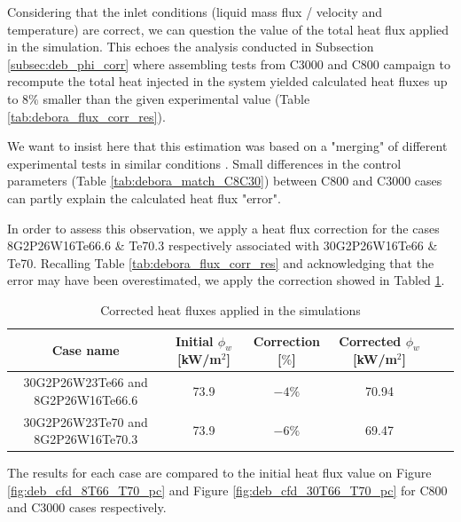\npar

Considering that the inlet conditions (liquid mass flux / velocity and temperature) are correct, we can question the value of the total heat flux applied in the simulation. This echoes the analysis conducted in Subsection \ref{subsec:deb_phi_corr} where assembling tests from C3000 and C800 campaign to recompute the total heat injected in the system yielded calculated heat fluxes up to $8\%$ smaller than the given experimental value (Table \ref{tab:debora_flux_corr_res}).

\begin{note*}{}
We want to insist here that this estimation was based on a "merging" of different experimental tests in similar conditions . Small differences in the control parameters (Table \ref{tab:debora_match_C8C30}) between C800 and C3000 cases can partly explain the calculated heat flux "error".
\end{note*}

\npar

In order to assess this observation, we apply a heat flux correction for the cases 8G2P26W16Te66.6 \& Te70.3 respectively associated with 30G2P26W16Te66 \& Te70. Recalling  Table \ref{tab:debora_flux_corr_res} and acknowledging that the error may have been overestimated, we apply the correction showed in Tabled \ref{tab:debora_cfd_phicorr}.
 





\begin{table}[!h]
\centering

\begin{tabular}{c||c|c|c|c|c}
Case name & Initial $\phi_{w}$ [kW/m$^{2}$] & Correction [$\%$] & Corrected $\phi_{w}$ [kW/m$^{2}$]\\
\hline
\hline
30G2P26W23Te66 and 8G2P26W16Te66.6 & 73.9 & $-4\%$ & 70.94 \\
\hline
30G2P26W23Te70 and 8G2P26W16Te70.3 & 73.9 & $-6\%$ & 69.47 \\
\end{tabular}

\caption{Corrected heat fluxes applied in the simulations}
\label{tab:debora_cfd_phicorr}

\end{table}

\npar

The results for each case are compared to the initial heat flux value on Figure \ref{fig:deb_cfd_8T66_T70_pc} and Figure \ref{fig:deb_cfd_30T66_T70_pc} for C800 and C3000 cases respectively.


